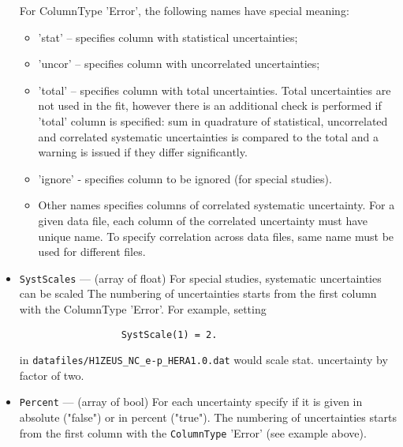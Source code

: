 \documentclass[11pt,a4paper]{article}
\begin{document}
\begin{itemize}
                      For ColumnType 'Error', the following names have special meaning:
                      \begin{itemize}
                       \item 'stat'  -- specifies column with statistical uncertainties;
                       \item 'uncor' -- specifies column with uncorrelated uncertainties;  
                       \item 'total' -- specifies column with total uncertainties. 
                                  Total uncertainties are not used in the fit,
                                  however there is an additional check is performed
                                  if 'total' column is specified: sum in quadrature
                                  of statistical, uncorrelated and correlated 
                                  systematic uncertainties is compared to the total
                                  and a warning is issued if they differ significantly.
                       \item'ignore' - specifies column to be ignored (for special studies).
                       \item Other names specifies columns of correlated systematic 
                      uncertainty. For a given data file, each column of the correlated
                      uncertainty must have unique name. To specify correlation across
                      data files, same name must be used for different files.  
                      \end{itemize}
      \item {\tt SystScales}  --- (array of float)
                      For special studies, systematic uncertainties can be scaled
                      The numbering of uncertainties starts from the first column
                      with the ColumnType 'Error'. For example, setting 
\begin{verbatim}
                  SystScale(1) = 2.  
\end{verbatim}
                      in {\tt datafiles/H1ZEUS\_NC\_e-p\_HERA1.0.dat} would scale stat. 
                      uncertainty by factor of two.                       
      \item {\tt Percent}     --- (array of bool) For each uncertainty specify if it is given in 
                      absolute ("false") or in percent ("true").  The numbering of 
                      uncertainties starts from the first column with the 
                      {\tt ColumnType} 'Error' (see example above).

\end{itemize}
\end{document}
